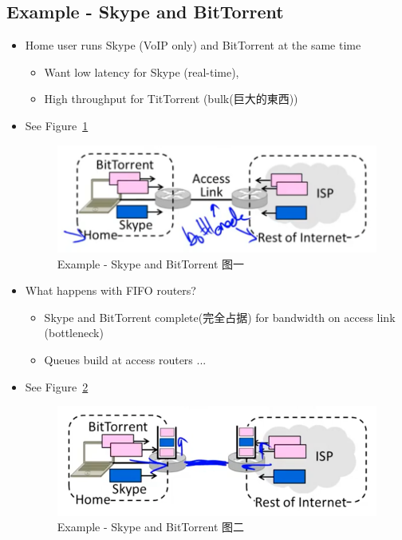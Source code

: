 \documentclass[12pt]{ctexart}   %
\begin{document}
	\subsection{Example - Skype and BitTorrent}
	\begin{itemize}
		\item Home user runs Skype (VoIP only) and BitTorrent at the same time
		\begin{itemize}
			\item Want low latency for Skype (real-time),
			\item High throughput for TitTorrent (bulk(巨大的東西))
		\end{itemize}
		\item See Figure~\ref{fig:9-1-3}
		  
		 \begin{figure}[h!] %
		\centering
		 \includegraphics[scale=0.7]{images/9-1-3}
		\caption{ Example - Skype and BitTorrent 图一 }
		 \label{fig:9-1-3}
		 \end{figure}
		 
		 \item What happens with FIFO routers?
		 \begin{itemize}
		 	\item Skype and BitTorrent complete(完全占据) for bandwidth on access link (bottleneck)
		 	\item Queues build at access routers ...
		 \end{itemize}
		 \item See Figure~\ref{fig:9-1-4}
		  
		 \begin{figure}[h!] %
		\centering
		 \includegraphics[scale=0.7]{images/9-1-4}
		\caption{ Example - Skype and BitTorrent 图二 }
		 \label{fig:9-1-4}
		 \end{figure}
		 

\end{itemize}
\end{document}
